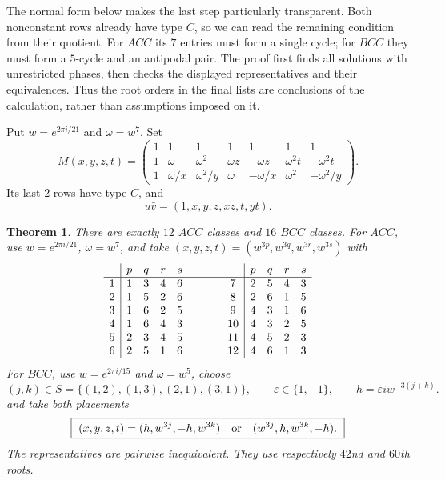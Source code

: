 \documentclass[11pt,a4paper]{article}
\newtheorem{theorem}{Theorem}[section]
\theoremstyle{plain}
\theoremstyle{definition}
\numberwithin{equation}{section}
\begin{document}
The normal form below makes the last step particularly transparent. Both nonconstant rows already have type $C$, so we can read the remaining condition from their quotient. For $ACC$ its $7$ entries must form a single cycle; for $BCC$ they must form a $5$-cycle and an antipodal pair. The proof first finds all solutions with unrestricted phases, then checks the displayed representatives and their equivalences. Thus the root orders in the final lists are conclusions of the calculation, rather than assumptions imposed on it.

Put $w=e^{2\pi i/21}$ and $\omega=w^7$. Set
\begin{equation}
\boxed{\quad
 M(x,y,z,t)=
 \begin{pmatrix}
 1&1&1&1&1&1&1\\
 1&\omega&\omega^2&\omega z&-\omega z&\omega^2t&-\omega^2t\\
 1&\omega/x&\omega^2/y&\omega&-\omega/x&\omega^2&-\omega^2/y
 \end{pmatrix}.\quad} \label{mixed:eq1}
\end{equation}
Its last $2$ rows have type $C$, and
\begin{equation}
 u\bar{v}=(1,x,y,z,xz,t,yt). \label{mixed:eq2}
\end{equation}
\begin{theorem}\label{mixed:mixed}
There are exactly $12$ $ACC$ classes and $16$ $BCC$ classes. For $ACC$, use $w=e^{2\pi i/21}$, $\omega=w^7$, and take $(x,y,z,t)=(w^{3p},w^{3q},w^{3r},w^{3s})$ with
$$
\begin{array}{c|rrrr@{\qquad\qquad}c|rrrr}
 &p&q&r&s&&p&q&r&s\\\hline
1&1&3&4&6&7&2&5&4&3\\
2&1&5&2&6&8&2&6&1&5\\
3&1&6&2&5&9&4&3&1&6\\
4&1&6&4&3&10&4&3&2&5\\
5&2&3&4&5&11&4&5&2&3\\
6&2&5&1&6&12&4&6&1&3
\end{array}
$$
For $BCC$, use $w=e^{2\pi i/15}$ and $\omega=w^5$, choose
$$
 (j,k)\in S=\{(1,2),(1,3),(2,1),(3,1)\},\qquad
 \varepsilon\in\{1,-1\},\qquad h=\varepsilon iw^{-3(j+k)}.
$$
and take both placements
\begin{equation}
 \boxed{\ (x,y,z,t)=(h,w^{3j},-h,w^{3k})
 \quad\hbox{or}\quad (w^{3j},h,w^{3k},-h).\ } \label{mixed:eq3}
\end{equation}
The representatives are pairwise inequivalent. They use respectively $42$nd and $60$th roots.
\end{theorem}
\end{document}
